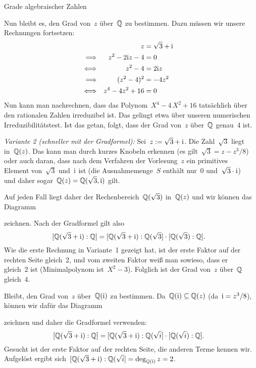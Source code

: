 \documentclass{algblatt}
\begin{document}
\begin{aufgabe}{Grade algebraischer Zahlen}
\begin{loesungE}
Nun bleibt es, den Grad von~$z$ über~$\mathbb{Q}$ zu bestimmen. Dazu müssen wir unsere
Rechnungen fortsetzen:
\begin{align*}
  && z &= \sqrt{3} + \mathrm{i} \\
  \Longrightarrow&& z^2 - 2\mathrm{i} z - 4 &= 0 \\
  \Longleftrightarrow&& z^2 - 4 &= 2 \mathrm{i} z \\
  \Longrightarrow&& (z^2 - 4)^2 &= -4z^2 \\
  \Longleftrightarrow&& z^4 - 4z^2 + 16 &= 0
\end{align*}
Nun kann man nachrechnen, dass das Polynom~$X^4 - 4\,X^2 + 16$ tatsächlich über
den rationalen Zahlen irreduzibel ist. Das gelingt etwa über unseren
numerischen Irreduzibilitätstest. Ist das getan, folgt, dass der Grad von~$z$
über~$\mathbb{Q}$ genau~4 ist.

\emph{Variante 2 (schneller mit der Gradformel):} Sei~$z := \sqrt{3} + \mathrm{i}$. Die
Zahl~$\sqrt{3}$ liegt in~$\mathbb{Q}(z)$. Das kann man durch kurzes Knobeln erkennen
(es gilt~$\sqrt{3} = z - z^3/8$) oder auch daran, dass nach dem Verfahren der
Vorlesung~$z$ ein primitives Element von~$\sqrt{3}$ und~$\mathrm{i}$ ist (die
Ausnahmemenge~$S$ enthält nur~$0$ und~$\sqrt{3} \cdot \mathrm{i}$) und daher
sogar~$\mathbb{Q}(z) = \mathbb{Q}(\sqrt{3}, \mathrm{i})$ gilt.

Auf jeden Fall liegt daher der Rechenbereich~$\mathbb{Q}(\sqrt{3})$ in~$\mathbb{Q}(z)$ und
wir können das Diagramm
\begin{center}\end{center}
zeichnen. Nach der Gradformel gilt also
\[ [\mathbb{Q}(\sqrt{3}+\mathrm{i}):\mathbb{Q}] = [\mathbb{Q}(\sqrt{3}+\mathrm{i}):\mathbb{Q}(\sqrt{3}] \cdot
  [\mathbb{Q}(\sqrt{3}):\mathbb{Q}]. \]
Wie die erste Rechnung in Variante~1 gezeigt hat, ist der erste Faktor auf der
rechten Seite gleich~2, und vom zweiten Faktor weiß man sowieso, dass er
gleich~2 ist (Minimalpolynom ist~$X^2 - 3$). Folglich ist der Grad von~$z$
über~$\mathbb{Q}$ gleich~$4$.

Bleibt, den Grad von~$z$ über~$\mathbb{Q}(\mathrm{i})$ zu bestimmen. Da~$\mathbb{Q}(\mathrm{i}) \subseteq
\mathbb{Q}(z)$ (da~$\mathrm{i} = z^3/8$), können wir dafür das Diagramm
\begin{center}\end{center}
zeichnen und daher die Gradformel verwenden:
\[ [\mathbb{Q}(\sqrt{3}+\mathrm{i}):\mathbb{Q}] = [\mathbb{Q}(\sqrt{3}+\mathrm{i}):\mathbb{Q}(\sqrt{i}] \cdot
  [\mathbb{Q}(\sqrt{i}):\mathbb{Q}]. \]
Gesucht ist der erste Faktor auf der rechten Seite, die anderen Terme kennen
wir. Aufgelöst ergibt sich~$[\mathbb{Q}(\sqrt{3}+\mathrm{i}):\mathbb{Q}(\sqrt{i}] =
\deg_{\mathbb{Q}(\mathrm{i})} z = 2$.


\end{loesungE}
\end{aufgabe}
\end{document}
